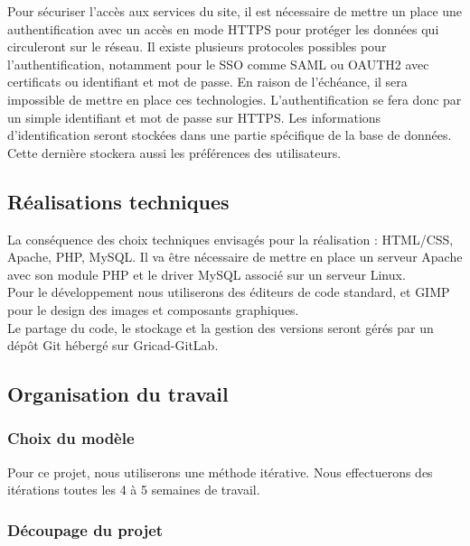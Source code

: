 \documentclass[a4paper,11pt]{article}
\begin{document}
Pour sécuriser l’accès aux services du site, il est nécessaire de mettre un place une authentification
avec un accès en mode HTTPS pour protéger les données qui circuleront sur le réseau. Il existe
plusieurs protocoles possibles pour l’authentification, notamment pour le SSO comme SAML ou
OAUTH2 avec certificats ou identifiant et mot de passe. En raison de l’échéance, il sera impossible de
mettre en place ces technologies. L’authentification se fera donc par un simple identifiant et mot de
passe sur HTTPS. Les informations d’identification seront stockées dans une partie spécifique de la
base de données. Cette dernière stockera aussi les préférences des utilisateurs.\\

\subsection{Réalisations techniques}

La conséquence des choix techniques envisagés pour la réalisation : HTML/CSS, Apache, PHP, MySQL.
Il va être nécessaire de mettre en place un serveur Apache avec son module PHP et le driver MySQL
associé sur un serveur Linux.\\

Pour le développement nous utiliserons des éditeurs de code standard, et GIMP pour le design des
images et composants graphiques.\\

Le partage du code, le stockage et la gestion des versions seront gérés par un dépôt Git hébergé sur
Gricad-GitLab.\\

\subsection{Organisation du travail}

\subsubsection{Choix du modèle}

Pour ce projet, nous utiliserons une méthode itérative. Nous effectuerons des itérations toutes les 4
à 5 semaines de travail.\\

\subsubsection{Découpage du projet}
\end{document}
